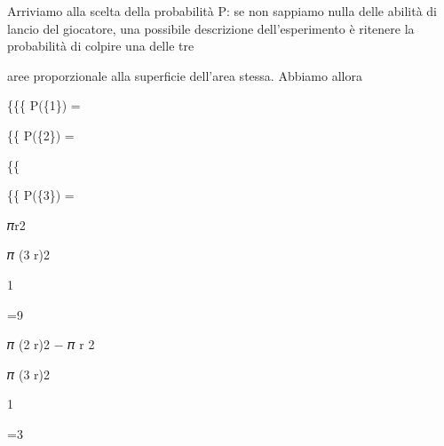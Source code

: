 \documentclass[a4paper,portrait,12pt]{article}
\begin{document}
\begin{flushleft}
Arriviamo alla scelta della probabilit\`{a} P: se non sappiamo nulla delle abilit\`{a} di lancio del giocatore, una possibile descrizione dell'esperimento \`{e} ritenere la probabilit\`{a} di colpire una delle tre
\end{flushleft}


\begin{flushleft}
aree proporzionale alla superficie dell'area stessa. Abbiamo allora
\end{flushleft}





\begin{flushleft}
\{\{\{ P(\{1\}) =
\end{flushleft}


\begin{flushleft}
\{\{ P(\{2\}) =
\end{flushleft}


\{\{


\begin{flushleft}
\{\{ P(\{3\}) =
\end{flushleft}





\begin{flushleft}
𝜋r2
\end{flushleft}


\begin{flushleft}
𝜋 (3 r)2
\end{flushleft}





1





=9





\begin{flushleft}
𝜋 (2 r)2 $-$ 𝜋 r 2
\end{flushleft}


\begin{flushleft}
𝜋 (3 r)2
\end{flushleft}





1





=3
\end{document}

